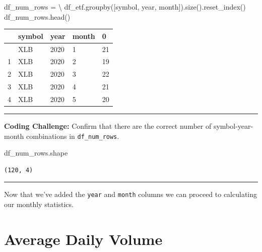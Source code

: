 \documentclass[
  letterpaper,
  DIV=11,
  numbers=noendperiod]{scrreprt}
\newenvironment{Shaded}{\begin{snugshade}}{\end{snugshade}}
\newcommand{\NormalTok}[1]{\textcolor[rgb]{0.00,0.23,0.31}{#1}}
\newcommand{\OperatorTok}[1]{\textcolor[rgb]{0.37,0.37,0.37}{#1}}
\newcommand{\StringTok}[1]{\textcolor[rgb]{0.13,0.47,0.30}{#1}}
\begin{document}
\begin{Shaded}
\begin{Highlighting}[]
\NormalTok{df\_num\_rows }\OperatorTok{=} \OperatorTok{\textbackslash{}}
\NormalTok{    df\_etf.groupby([}\StringTok{\textquotesingle{}symbol\textquotesingle{}}\NormalTok{, }\StringTok{\textquotesingle{}year\textquotesingle{}}\NormalTok{, }\StringTok{\textquotesingle{}month\textquotesingle{}}\NormalTok{]).size().reset\_index()}
\NormalTok{df\_num\_rows.head()}
\end{Highlighting}
\end{Shaded}

\begin{longtable}[]{@{}lllll@{}}
\toprule\noalign{}
& symbol & year & month & 0 \\
\midrule\noalign{}
\endhead
\bottomrule\noalign{}
\endlastfoot
0 & XLB & 2020 & 1 & 21 \\
1 & XLB & 2020 & 2 & 19 \\
2 & XLB & 2020 & 3 & 22 \\
3 & XLB & 2020 & 4 & 21 \\
4 & XLB & 2020 & 5 & 20 \\
\end{longtable}

\begin{center}\rule{0.5\linewidth}{0.5pt}\end{center}

\textbf{Coding Challenge:} Confirm that there are the correct number of
symbol-year-month combinations in \texttt{df\_num\_rows}.

\begin{Shaded}
\begin{Highlighting}[]
\NormalTok{df\_num\_rows.shape}
\end{Highlighting}
\end{Shaded}

\begin{verbatim}
(120, 4)
\end{verbatim}

\begin{center}\rule{0.5\linewidth}{0.5pt}\end{center}

Now that we've added the \texttt{year} and \texttt{month} columns we can
proceed to calculating our monthly statistics.

\hypertarget{average-daily-volume}{%
\section{Average Daily Volume}\label{average-daily-volume}}
\end{document}
